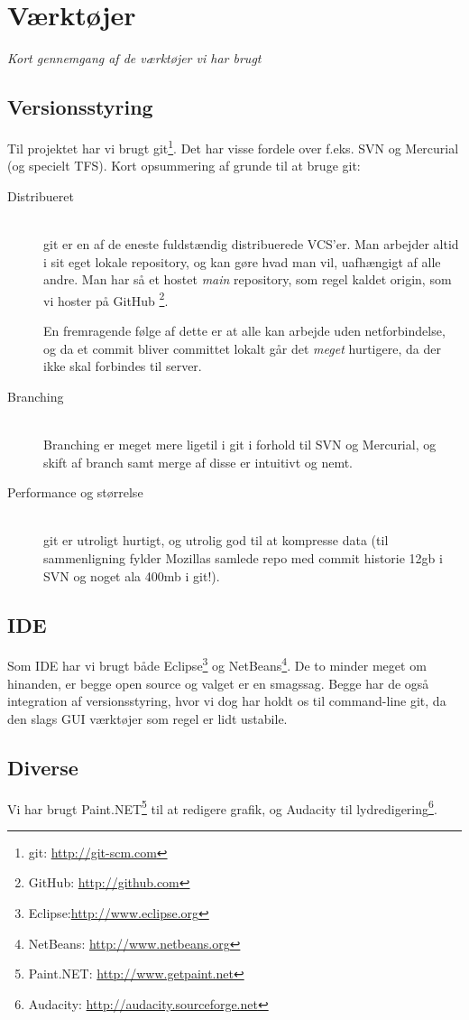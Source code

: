 \documentclass[titlepage,danish]{article}
\begin{document}
\section{Værktøjer}
\emph{Kort gennemgang af de værktøjer vi har brugt}
\subsection{Versionsstyring}
Til projektet har vi brugt git\footnote{git: \url{http://git-scm.com}}. Det har visse fordele over
f.eks. SVN og Mercurial (og specielt TFS). Kort opsummering af grunde til at bruge git:

\begin{description}
  \item[Distribueret] \hfill \\
    git er en af de eneste fuldstændig distribuerede VCS'er. Man arbejder altid i sit eget lokale
    repository, og kan gøre hvad man vil, uafhængigt af alle andre. Man har så et hostet
    \emph{main} repository, som regel kaldet origin, som vi hoster på GitHub \footnote{GitHub:
      \url{http://github.com}}. 

    En fremragende følge af dette er at alle kan arbejde uden netforbindelse, og da et commit bliver
    committet lokalt går det \emph{meget} hurtigere, da der ikke skal forbindes til server.

  \item[Branching] \hfill \\
    Branching er meget mere ligetil i git i forhold til SVN og Mercurial, og skift af branch samt
    merge af disse er intuitivt og nemt.

  \item[Performance og størrelse] \hfill \\
    git er utroligt hurtigt, og utrolig god til at kompresse data (til sammenligning fylder Mozillas
    samlede repo med commit historie 12gb i SVN og noget ala 400mb i git!).
\end{description}

\subsection{IDE}
Som IDE har vi brugt både Eclipse\footnote{Eclipse:\url{http://www.eclipse.org}} og
NetBeans\footnote{NetBeans: \url{http://www.netbeans.org}}. De to minder meget om hinanden, er begge
open source og valget er en smagssag. Begge har de også integration af versionsstyring, hvor vi dog
har holdt os til command-line git, da den slags GUI værktøjer som regel er lidt ustabile.

\subsection{Diverse}
Vi har brugt Paint.NET\footnote{Paint.NET: \url{http://www.getpaint.net}} til at redigere grafik, og
Audacity til lydredigering\footnote{Audacity: \url{http://audacity.sourceforge.net}}.
\end{document}
